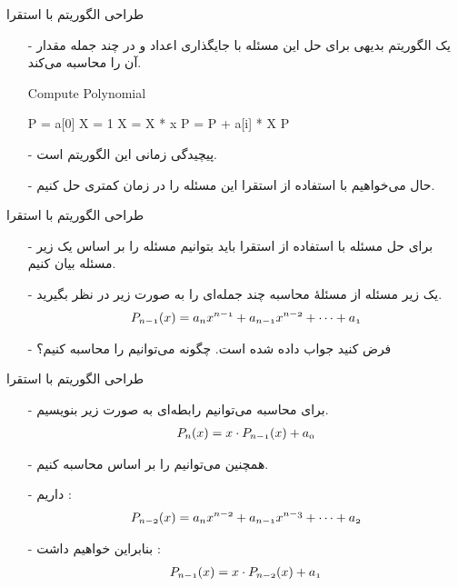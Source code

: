 \begin{frame}{‌طراحی الگوریتم با استقرا}
\begin{itemize}\itemr
\item[-]
یک الگوریتم بدیهی برای حل این مسئله با جایگذاری اعداد
و
در چند جمله
مقدار آن را محاسبه می‌کند.
\begin{algorithm}[H]\alglr
\caption{Compute Polynomial}
  \begin{algorithmic}[1]
    \State P = a[0]
      \State X = 1
          \State X = X * x
       \EndFor
       \State P = P + a[i] * X
     \EndFor
     \State \Return P                          
  \end{algorithmic}
  \label{alg:merge}
\end{algorithm}
\item[-]
پیچیدگی زمانی این الگوریتم
است.
\item[-]
حال می‌خواهیم با استفاده از استقرا این مسئله را در زمان کمتری حل کنیم.
\end{itemize}
\end{frame}


\begin{frame}{‌طراحی الگوریتم با استقرا}
\begin{itemize}\itemr
\item[-]
برای حل مسئله با استفاده از استقرا باید بتوانیم مسئله را بر اساس یک زیر مسئله بیان کنیم.
\item[-]
یک زیر مسئله از مسئلهٔ محاسبه چند جمله‌ای را به صورت زیر در نظر بگیرید.
\begin{align*}
\mathnormal{P_{n-1}(x) = a_nx^{n-1} + a_{n-1}x^{n-2} + \cdots + a_1}
\end{align*}
\item[-]
فرض کنید جواب
داده شده است. چگونه می‌توانیم
را محاسبه کنیم؟
\end{itemize}
\end{frame}


\begin{frame}{‌طراحی الگوریتم با استقرا}
\begin{itemize}\itemr
\item[-]
برای محاسبه
می‌توانیم رابطه‌ای به صورت زیر بنویسیم.
\begin{align*}
\mathnormal{P_n(x) = x \cdot P_{n-1}(x) + a_0}
\end{align*}
\item[-]
همچنین می‌توانیم
را بر اساس
محاسبه کنیم.
\item[-]
داریم :
\begin{align*}
\mathnormal{P_{n-2}(x) = a_nx^{n-2} + a_{n-1}x^{n-3} + \cdots + a_2}
\end{align*}
\item[-]
بنابراین خواهیم داشت :
\begin{align*}
\mathnormal{P_{n-1}(x) = x \cdot P_{n-2}(x) + a_1}
\end{align*}
\end{itemize}
\end{frame}


